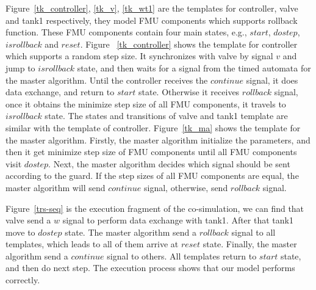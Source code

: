 Figure~\ref{tk_controller}, \ref{tk_v}, \ref{tk_wt1} are the templates for controller, valve and tank1 respectively, they model FMU components which supports rollback function. These FMU components contain four main states, e.g., $start$, $dostep$, $isrollback$ and $reset$. Figure~ \ref{tk_controller} shows the template for controller which supports a random step size. It synchronizes with valve by signal $v$ and jump to $isrollback$ state, and then waits for a signal from the timed automata for the master algorithm. Until the controller receives the $continue$ signal, it does data exchange, and return to $start$ state. Otherwise it receives $rollback$ signal, once it obtains the minimize step size of all FMU components, it travels to $isrollback$ state. The states and transitions of valve and tank1 template are similar with the template of controller. Figure~\ref{tk_ma} shows the template for the master algorithm. Firstly, the master algorithm initialize the parameters, and then it get minimize step size of FMU components until all FMU components visit $dostep$. Next, the master algorithm decides which signal should be sent according to the guard. If the step sizes of all FMU components are equal, the master algorithm will send $continue$ signal, otherwise, send $rollback$ signal.

Figure~\ref{trs-seq} is the execution fragment of the co-simulation, we can find that valve send a $w$ signal to perform data exchange with tank1. After that tank1 move to $dostep$ state. The master algorithm send a $rollback$ signal to all templates, which leads to all of them arrive at $reset$ state. Finally, the master algorithm send a $continue$ signal to others. All templates return to $start$ state, and then do next step. The execution process shows that our model performs correctly.

